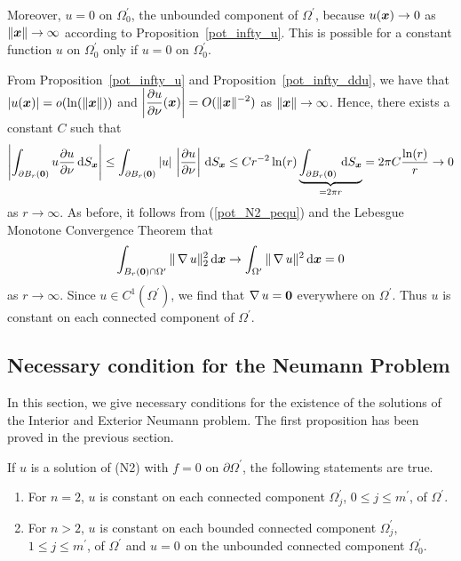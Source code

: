 Moreover, $u=0$ on $\displaystyle \Omega_0^{\prime}$, the unbounded component
of $\displaystyle \Omega^{\prime}$, because $u({\bm{x}}) \rightarrow 0$ as
$\|{\bm{x}}\|\rightarrow \infty$ according to
Proposition~\ref{pot_infty_u}.  This is possible for a constant
function $u$ on $\displaystyle \Omega_0^{\prime}$ only if $u=0$
on $\displaystyle \Omega_0^{\prime}$.

 From Proposition~\ref{pot_infty_u} and
Proposition~\ref{pot_infty_ddu}, we have that
$|u({\bm{x}})| = o(\ln(\|{\bm{x}}\|))$ and
$\displaystyle \left| \frac{\partial{u}}{\partial \nu}({\bm{x}})\right|
= O(\|{\bm{x}}\|^{-2})$ as $\|{\bm{x}}\|\rightarrow \infty$.  Hence,
there exists a constant $C$ such that
\[
\left| \int_{\partial B_r({\bm{0}})} u \frac{\partial{u}}{\partial \nu} \,\mathrm{d}{S}_{{\bm{x}}}
\right| \leq
\int_{\partial B_r({\bm{0}})} \left| u \right|\,\left| \frac{\partial{u}}{\partial \nu} \right|
\,\mathrm{d}{S}_{{\bm{x}}}
\leq C r^{-2} \ln(r)
\underbrace{\int_{\partial B_r({\bm{0}})} \,\mathrm{d}{S}_{{\bm{x}}}}_{=2\pi r}
= 2\pi C \frac{\ln(r)}{r} \rightarrow 0
\]
as $r \rightarrow \infty$.
As before, it follows from (\ref{pot_N2_pequ}) and the Lebesgue
Monotone Convergence Theorem that
\[
\int_{B_r({\bm{0}})\cap\Omega^{\prime}} \| \operatorname{\nabla} u \|_2^2 \,\mathrm{d}{{\bm{x}}} \rightarrow
\int_{\Omega^{\prime}} \| \operatorname{\nabla} u \|^2 \,\mathrm{d}{{\bm{x}}} = 0
\]
as $r \rightarrow \infty$.
Since $\displaystyle u \in C^1(\Omega^{\prime})$, we find that
$\operatorname{\nabla} u = {\bm{0}}$ everywhere on $\displaystyle \Omega^{\prime}$.
Thus $u$ is constant on each connected component of
$\displaystyle \Omega^{\prime}$.

\subsection{Necessary condition for the Neumann Problem}
\label{pot_sect_necessary}

In this section, we give necessary conditions for the existence of the
solutions of the Interior and Exterior Neumann problem.  The first
proposition has been proved in the previous section.

\begin{prop} \label{pot_nec_Nprobl0}
If $u$ is a solution of (N2) with $f=0$ on
$\displaystyle \partial \Omega^{\prime}$, the following statements are true.
\begin{enumerate}
\item For $n=2$, $u$ is constant on each connected component
$\displaystyle \Omega^{\prime}_j$,
$\displaystyle 0\leq j \leq m^{\prime}$, of $\displaystyle \Omega^{\prime}$.
\item For $n>2$, $u$ is constant on each bounded connected component
$\displaystyle \Omega^{\prime}_j$,
$\displaystyle 1\leq j \leq m^{\prime}$, of $\displaystyle \Omega^{\prime}$
and $u=0$ on the unbounded connected component
$\displaystyle \Omega^{\prime}_0$.
\end{enumerate}
\end{prop}

